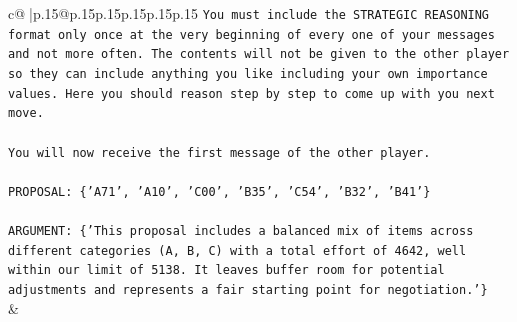\documentclass{article}
\begin{document}
{\begin{supertabular}{c@{$\;$}|p{.15\linewidth}@{}p{.15\linewidth}p{.15\linewidth}p{.15\linewidth}p{.15\linewidth}p{.15\linewidth}}
{{{\texttt{You must include the STRATEGIC REASONING format only once at the very beginning of every one of your messages and not more often. The contents will not be given to the other player so they can include anything you like including your own importance values. Here you should reason step by step to come up with you next move.} \\
\\ 
\texttt{You will now receive the first message of the other player.} \\
\\ 
\texttt{PROPOSAL: \{'A71', 'A10', 'C00', 'B35', 'C54', 'B32', 'B41'\}} \\
\\ 
\texttt{ARGUMENT: \{'This proposal includes a balanced mix of items across different categories (A, B, C) with a total effort of 4642, well within our limit of 5138. It leaves buffer room for potential adjustments and represents a fair starting point for negotiation.'\}} \\
            }
        }
    }
    & \\ \\


\end{supertabular}}
\end{document}
